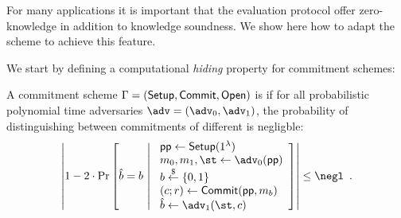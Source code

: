 For many applications it is important that the evaluation protocol offer zero-knowledge in addition to knowledge soundness. We show here how to adapt the scheme to achieve this feature.

We start by defining a computational \emph{hiding} property for commitment schemes:

\begin{definition}
A commitment scheme $\Gamma = (\textsf{{Setup}}, \textsf{{Commit}}, \textsf{{Open}})$ is  if for all probabilistic polynomial time adversaries $\adv = (\adv_0, \adv_1)$, the probability of distinguishing between commitments of different is negligble:
\[
	\left| 1 - 2 \cdot \mathrm{Pr}\left[
		\hat{b} = b \ \middle| \ 
		\begin{array}{l}
			\params \gets \pro{Setup}(1^\lambda) \\
			m_0, m_1, \st \gets \adv_0(\params) \\
			b \sample \{0,1\} \\
			(c; r) \gets \pro{Commit}(\params, m_b) \\
			\hat{b} \gets \adv_1(\st, c)
		\end{array}
	\right] \right| \leq \negl \enspace .
\]
\end{definition}

